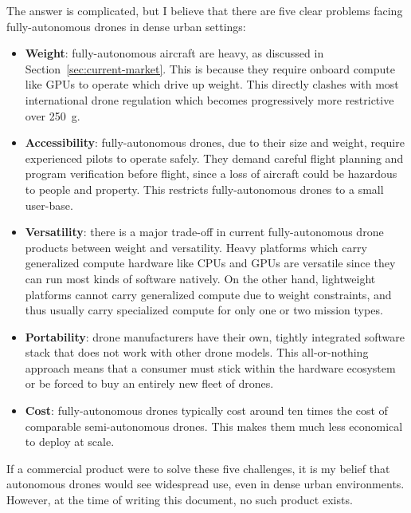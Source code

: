 The answer is complicated, but I believe that there are five clear problems facing fully-autonomous drones in dense urban settings: \\[0.1]
\begin{itemize}
    \item \textbf{Weight}: fully-autonomous aircraft are heavy, as discussed in Section~\ref{sec:current-market}. This is because they require onboard compute like GPUs to operate which drive up weight. This directly clashes with most international drone regulation which becomes progressively more restrictive over 250~g. \\[0.1]
    \item \textbf{Accessibility}: fully-autonomous drones, due to their size and weight, require experienced pilots to operate safely. They demand careful flight planning and program verification before flight, since a loss of aircraft could be hazardous to people and property. This restricts fully-autonomous drones to a small user-base. \\[0.1]
    \item \textbf{Versatility}: there is a major trade-off in current fully-autonomous drone products between weight and versatility. Heavy platforms which carry generalized compute hardware like CPUs and GPUs are versatile since they can run most kinds of software natively. On the other hand, lightweight platforms cannot carry generalized compute due to weight constraints, and thus usually carry specialized compute for only one or two mission types. \\[0.1]
    \item \textbf{Portability}: drone manufacturers have their own, tightly integrated software stack that does not work with other drone models. This all-or-nothing approach means that a consumer must stick within the hardware ecosystem or be forced to buy an entirely new fleet of drones. \\[0.1]
    \item \textbf{Cost}: fully-autonomous drones typically cost around ten times the cost of comparable semi-autonomous drones. This makes them much less economical to deploy at scale. 
    \\[0.1]
\end{itemize}
If a commercial product were to solve these five challenges, it is my belief that autonomous drones would see widespread use, even in dense urban environments. However, at the time of writing this document, no such product exists.

